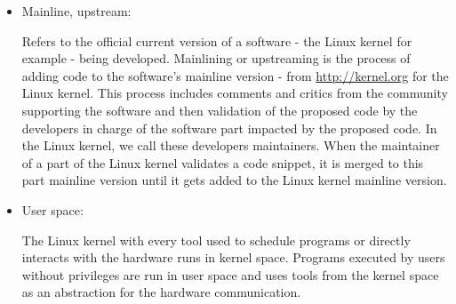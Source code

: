 \begin{itemize}
\item Mainline, upstream:

Refers to the official current version of a software - the Linux kernel for example - being developed. Mainlining or upstreaming is the process of adding code to the software's mainline version - from \url{http://kernel.org} for the Linux kernel. This process includes comments and critics from the community supporting the software and then validation of the proposed code by the developers in charge of the software part impacted by the proposed code. In the Linux kernel, we call these developers maintainers. When the maintainer of a part of the Linux kernel validates a code snippet, it is merged to this part mainline version until it gets added to the Linux kernel mainline version.

\item User space:

The Linux kernel with every tool used to schedule programs or directly interacts with the hardware runs in kernel space. Programs executed by users without privileges are run in user space and uses tools from the kernel space as an abstraction for the hardware communication.

\end{itemize}
